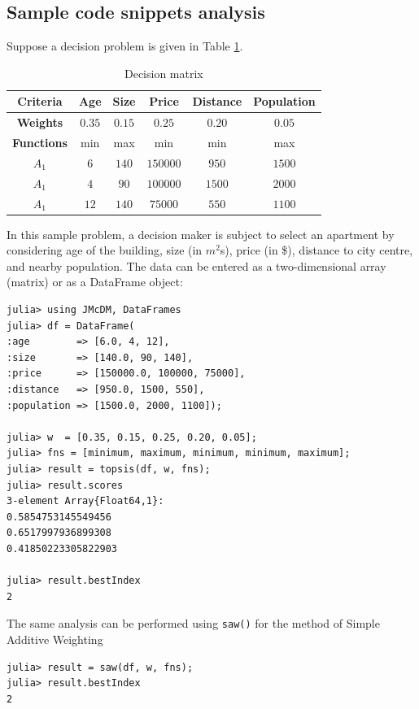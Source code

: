 \documentclass[authoryear,preprint,review,12pt]{elsarticle}
\begin{document}
\subsection{Sample code snippets analysis}
\label{}
Suppose a decision problem is given in Table \ref{table:example_problem}.

\begin{table}[H]
	\centering
	\begin{tabular}{|c|c|c|c|c|c|}
		\hline
		\textbf{Criteria} & {Age} & {Size} &  {Price} & {Distance} & {Population}\\
		\hline
		\textbf{Weights} & {$0.35$} & {$0.15$} & {$0.25$}& {$0.20$} & {$0.05$} \\
		\hline
		\textbf{Functions} & min  & max & min & min & max\\
		\hline
		\hline
		{$A_1$} & {$6$} & {$140$} & $150000$ & {$950$} & $1500$\\
		\hline
		{$A_1$} & {$4$} & {$90$} & $100000$ & {$1500$} & $2000$\\
		\hline
		{$A_1$} & {$12$} & {$140$} & $75000$ & {$550$} & $1100$\\
		\hline
	\end{tabular}
	\caption{Decision matrix}
	\label{table:example_problem} 
\end{table}

In this sample problem, a decision maker is subject to select an apartment by considering age of the building, size (in $m^2$s), price (in \$), distance to city centre, and nearby population.
The data can be entered as a two-dimensional array (matrix) or as a DataFrame object:

\begin{verbatim}
julia> using JMcDM, DataFrames
julia> df = DataFrame(
:age        => [6.0, 4, 12],
:size       => [140.0, 90, 140],
:price      => [150000.0, 100000, 75000],
:distance   => [950.0, 1500, 550],
:population => [1500.0, 2000, 1100]);

julia> w  = [0.35, 0.15, 0.25, 0.20, 0.05];
julia> fns = [minimum, maximum, minimum, minimum, maximum];
julia> result = topsis(df, w, fns);
julia> result.scores
3-element Array{Float64,1}:
0.5854753145549456
0.6517997936899308
0.41850223305822903

julia> result.bestIndex
2
\end{verbatim}

The same analysis can be performed using \texttt{saw()} for the method of Simple Additive Weighting

\begin{verbatim}
julia> result = saw(df, w, fns);
julia> result.bestIndex
2
\end{verbatim}
\end{document}
